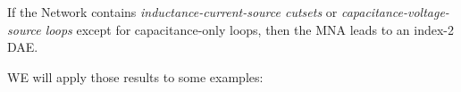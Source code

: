 \begin{theorem} \cite{Tischendorf2004Topological}
	If the Network contains \emph{inductance-current-source cutsets} or \emph{capacitance-voltage-source loops} except for capacitance-only loops, then the MNA leads to an index-2 DAE.
\end{theorem}

WE will apply those results to some examples: